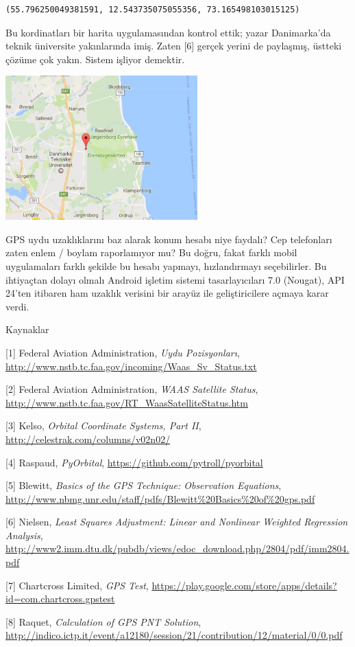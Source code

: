 \documentclass[12pt,fleqn]{article}\usepackage{../../common}
\begin{document}
\begin{verbatim}
(55.796250049381591, 12.543735075055356, 73.165498103015125)
\end{verbatim}

Bu kordinatları bir harita uygulamasından kontrol ettik; yazar Danimarka'da
teknik üniversite yakınlarında imiş. Zaten [6] gerçek yerini de paylaşmış,
üstteki çözüme çok yakın. Sistem işliyor demektir.

\includegraphics[width=20em]{denmark.jpg}

GPS uydu uzaklıklarını baz alarak konum hesabı niye faydalı? Cep
telefonları zaten enlem / boylam raporlamıyor mu? Bu doğru, fakat farklı
mobil uygulamaları farklı şekilde bu hesabı yapmayı, hızlandırmayı
seçebilirler. Bu ihtiyaçtan dolayı olmalı Android işletim sistemi
tasarlayıcıları 7.0 (Nougat), API 24'ten itibaren ham uzaklık verisini bir
arayüz ile geliştiricilere açmaya karar verdi.

Kaynaklar 

[1] Federal Aviation Administration, {\em Uydu Pozisyonları}, \url{http://www.nstb.tc.faa.gov/incoming/Waas_Sv_Status.txt}

[2] Federal Aviation Administration, {\em WAAS Satellite Status}, \url{http://www.nstb.tc.faa.gov/RT_WaasSatelliteStatus.htm}

[3] Kelso, {\em Orbital Coordinate Systems, Part II}, \url{http://celestrak.com/columns/v02n02/}

[4] Raspaud, {\em PyOrbital}, \url{https://github.com/pytroll/pyorbital}

[5] Blewitt, {\em Basics of the GPS Technique: Observation Equations},  \url{http://www.nbmg.unr.edu/staff/pdfs/Blewitt%20Basics%20of%20gps.pdf}

[6] Nielsen, {\em Least Squares Adjustment: Linear and Nonlinear Weighted Regression Analysis}, \url{http://www2.imm.dtu.dk/pubdb/views/edoc_download.php/2804/pdf/imm2804.pdf}

[7] Chartcross Limited, {\em GPS Test}, \url{https://play.google.com/store/apps/details?id=com.chartcross.gpstest}

[8] Raquet, {\em Calculation of GPS PNT Solution}, \url{http://indico.ictp.it/event/a12180/session/21/contribution/12/material/0/0.pdf}
\end{document}
